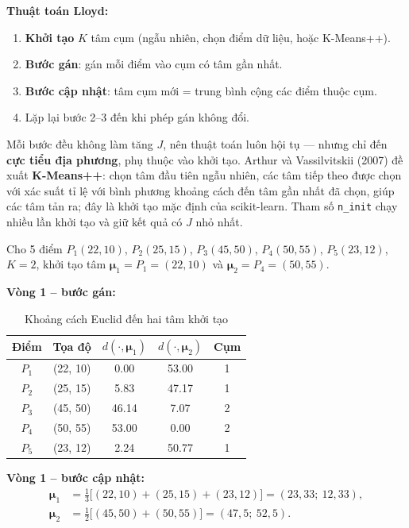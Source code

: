 \noindent\textbf{Thuật toán Lloyd:}
\begin{enumerate}
    \item \textbf{Khởi tạo} $K$ tâm cụm (ngẫu nhiên, chọn điểm dữ liệu, hoặc K-Means++).
    \item \textbf{Bước gán}: gán mỗi điểm vào cụm có tâm gần nhất.
    \item \textbf{Bước cập nhật}: tâm cụm mới = trung bình cộng các điểm thuộc cụm.
    \item Lặp lại bước 2--3 đến khi phép gán không đổi.
\end{enumerate}
Mỗi bước đều không làm tăng $J$, nên thuật toán luôn hội tụ --- nhưng chỉ đến \textbf{cực tiểu địa phương}, phụ thuộc vào khởi tạo. Arthur và Vassilvitskii (2007) đề xuất \textbf{K-Means++}: chọn tâm đầu tiên ngẫu nhiên, các tâm tiếp theo được chọn với xác suất tỉ lệ với bình phương khoảng cách đến tâm gần nhất đã chọn, giúp các tâm tản ra; đây là khởi tạo mặc định của scikit-learn. Tham số \texttt{n\_init} chạy nhiều lần khởi tạo và giữ kết quả có $J$ nhỏ nhất.

\begin{example}
Cho 5 điểm $P_1(22, 10)$, $P_2(25, 15)$, $P_3(45, 50)$, $P_4(50, 55)$, $P_5(23, 12)$, $K = 2$, khởi tạo tâm $\boldsymbol{\mu}_1 = P_1 = (22, 10)$ và $\boldsymbol{\mu}_2 = P_4 = (50, 55)$.
\end{example}

\noindent\textbf{Vòng 1 -- bước gán:}
\begin{table}[H]
\centering
\begin{tabular}{|c|c|c|c|c|}
\hline
\textbf{Điểm} & \textbf{Tọa độ} & $d(\cdot, \boldsymbol{\mu}_1)$ & $d(\cdot, \boldsymbol{\mu}_2)$ & \textbf{Cụm} \\
\hline
$P_1$ & (22, 10) & 0.00 & 53.00 & 1 \\ \hline
$P_2$ & (25, 15) & 5.83 & 47.17 & 1 \\ \hline
$P_3$ & (45, 50) & 46.14 & 7.07 & 2 \\ \hline
$P_4$ & (50, 55) & 53.00 & 0.00 & 2 \\ \hline
$P_5$ & (23, 12) & 2.24 & 50.77 & 1 \\ \hline
\end{tabular}
\caption{Khoảng cách Euclid đến hai tâm khởi tạo}
\end{table}

\noindent\textbf{Vòng 1 -- bước cập nhật:}
\begin{align*}
    \boldsymbol{\mu}_1 &= \tfrac{1}{3}\big[(22, 10) + (25, 15) + (23, 12)\big] = (23{,}33;\ 12{,}33), \\
    \boldsymbol{\mu}_2 &= \tfrac{1}{2}\big[(45, 50) + (50, 55)\big] = (47{,}5;\ 52{,}5).
\end{align*}

